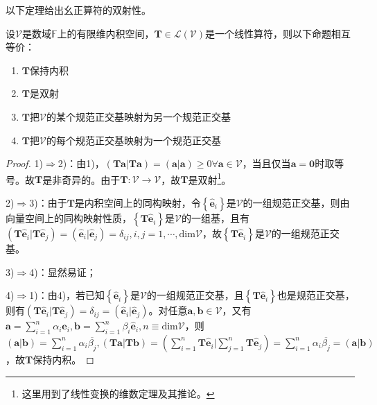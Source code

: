 \documentclass[main.tex]{subfiles}
\begin{document}
以下定理给出幺正算符的双射性。

\begin{theorem}\label{thm:II.6.3}
设$\mathcal{V}$是数域$\mathbb{F}$上的有限维内积空间，$\mathbf{T}\in\mathcal{L}\left(\mathcal{V}\right)$是一个线性算符，则以下命题相互等价：
\begin{enumerate}
    \item $\mathbf{T}$保持内积
    \item $\mathbf{T}$是双射
    \item $\mathbf{T}$把$\mathcal{V}$的某个规范正交基映射为另一个规范正交基
    \item $\mathbf{T}$把$\mathcal{V}$的每个规范正交基映射为一个规范正交基
\end{enumerate}
\end{theorem}
\begin{proof}
1)$\Rightarrow$2)：由1)，$\left(\mathbf{Ta}|\mathbf{Ta}\right)=\left(\mathbf{a}|\mathbf{a}\right)\geq0\forall\mathbf{a}\in\mathcal{V}$，当且仅当$\mathbf{a}=\mathbf{0}$时取等号。故$\mathbf{T}$是非奇异的。由于$\mathbf{T}:\mathcal{V}\rightarrow\mathcal{V}$，故$\mathbf{T}$是双射\footnote{这里用到了线性变换的维数定理及其推论。}。

2)$\Rightarrow$3)：由于$\mathbf{T}$是内积空间上的同构映射，令$\left\{\mathbf{\hat{e}}_i\right\}$是$\mathcal{V}$的一组规范正交基，则由向量空间上的同构映射性质，$\left\{\mathbf{T\hat{e}}_i\right\}$是$\mathcal{V}$的一组基，且有$\left(\mathbf{T\hat{e}}_i|\mathbf{T\hat{e}}_j\right)=\left(\mathbf{\hat{e}}_i|\mathbf{\hat{e}}_j\right)=\delta_{ij},i,j=1,\cdots,\mathrm{dim}\mathcal{V}$，故$\left\{\mathbf{T\hat{e}}_i\right\}$是$\mathcal{V}$的一组规范正交基。

3)$\Rightarrow$4)：显然易证；

4)$\Rightarrow$1)：由4)，若已知$\left\{\mathbf{\hat{e}}_i\right\}$是$\mathcal{V}$的一组规范正交基，且$\left\{\mathbf{T\hat{e}}_i\right\}$也是规范正交基，则有$\left(\mathbf{T\hat{e}}_i|\mathbf{T\hat{e}}_j\right)=\delta_{ij}=\left(\mathbf{\hat{e}}_i|\mathbf{\hat{e}}_j\right)$。对任意$\mathbf{a},\mathbf{b}\in\mathcal{V}$，又有$\mathbf{a}=\sum_{i=1}^{n}\alpha_i\mathbf{\hat{e}}_i,\mathbf{b}=\sum_{i=1}^{n}\beta_i\mathbf{\hat{e}}_i,n\equiv\mathrm{dim}\mathcal{V}$，则$\left(\mathbf{a}|\mathbf{b}\right)=\sum_{i=1}^n\alpha_i\overline{\beta_j},\left(\mathbf{Ta}|\mathbf{Tb}\right)=\left(\sum_{i=1}^n\mathbf{T\hat{e}}_i|\sum_{j=1}^n\mathbf{T\hat{e}}_j\right)=\sum_{i=1}^n\alpha_i\overline{\beta_j}=\left(\mathbf{a}|\mathbf{b}\right)$，故$\mathbf{T}$保持内积。
\end{proof}
\end{document}

